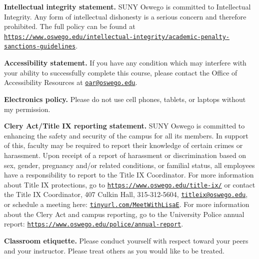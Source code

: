 \documentclass[11pt]{amsart}
\begin{document}
\smallskip
\textbf{Intellectual integrity statement.} SUNY Oswego is committed to Intellectual Integrity. Any form of intellectual dishonesty is a serious concern and therefore prohibited. The full policy can be found at \href{https://www.oswego.edu/intellectual-integrity/academic-penalty-sanctions-guidelines}{\nolinkurl{https://www.oswego.edu/intellectual-integrity/academic-penalty-sanctions-guidelines}}.

\smallskip
\textbf{Accessibility statement.} If you have any condition which may interfere with your ability to successfully complete this course, please contact the Office of Accessibility Resources at \texttt{\href{mailto:oar@oswego.edu}{oar@oswego.edu}}.

\smallskip
\textbf{Electronics policy.} Please do not use cell phones, tablets, or laptops without my permission.

\smallskip
\textbf{Clery Act/Title IX reporting statement.} SUNY Oswego is committed to enhancing the safety and security of the campus for all its members. In support of this, faculty may be required to report their knowledge of certain crimes or harassment. Upon receipt of a report of harassment or discrimination based on sex, gender, pregnancy and/or related conditions, or familial status, all employees have a responsibility to report to the Title IX Coordinator. For more information about Title IX protections, go to \texttt{\href{https://www.oswego.edu/title-ix/}{https://www.oswego.edu/title-ix/}} or contact the Title IX Coordinator, 407 Culkin Hall, 315-312-5604, \texttt{\href{mailto:titleix@oswego.edu}{titleix@oswego.edu}}, or schedule a meeting here: \texttt{\href{http://www.tinyurl.com/MeetWithLisaE}{tinyurl.com/MeetWithLisaE}}. For more information about the Clery Act and campus reporting, go to the University Police annual report: \texttt{\href{https://www.oswego.edu/police/annual-report}{https://www.oswego.edu/police/annual-report}}.

\smallskip
\textbf{Classroom etiquette.} Please conduct yourself with respect toward your peers and your instructor. Please treat others as you would like to be treated.
\end{document}
